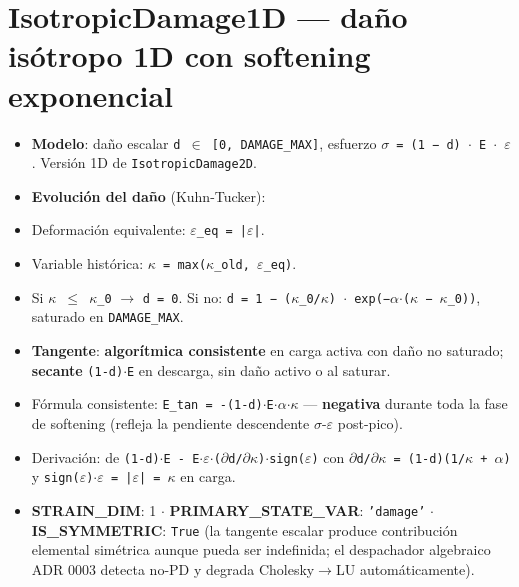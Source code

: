 \documentclass[11pt,letterpaper,oneside]{report}
\begin{document}
\section{IsotropicDamage1D --- daño isótropo 1D con softening exponencial}

\begin{itemize}
  \item \textbf{Modelo}: daño escalar \texttt{d \ensuremath{\in} [0, DAMAGE\_MAX]}, esfuerzo \texttt{\ensuremath{\sigma} = (1 − d) \ensuremath{\cdot} E \ensuremath{\cdot} \ensuremath{\varepsilon}}. Versión 1D de \texttt{IsotropicDamage2D}.
  \item \textbf{Evolución del daño} (Kuhn-Tucker):
  \item Deformación equivalente: \texttt{\ensuremath{\varepsilon}\_eq = |\ensuremath{\varepsilon}|}.
  \item Variable histórica: \texttt{\ensuremath{\kappa} = max(\ensuremath{\kappa}\_old, \ensuremath{\varepsilon}\_eq)}.
  \item Si \texttt{\ensuremath{\kappa} \ensuremath{\le} \ensuremath{\kappa}\_0} \ensuremath{\to} \texttt{d = 0}. Si no: \texttt{d = 1 − (\ensuremath{\kappa}\_0/\ensuremath{\kappa}) \ensuremath{\cdot} exp(−\ensuremath{\alpha}\ensuremath{\cdot}(\ensuremath{\kappa} − \ensuremath{\kappa}\_0))}, saturado en \texttt{DAMAGE\_MAX}.
  \item \textbf{Tangente}: \textbf{algorítmica consistente} en carga activa con daño no saturado; \textbf{secante} \texttt{(1-d)\ensuremath{\cdot}E} en descarga, sin daño activo o al saturar.
  \item Fórmula consistente: \texttt{E\_tan = -(1-d)\ensuremath{\cdot}E\ensuremath{\cdot}\ensuremath{\alpha}\ensuremath{\cdot}\ensuremath{\kappa}} --- \textbf{negativa} durante toda la fase de softening (refleja la pendiente descendente \ensuremath{\sigma}-\ensuremath{\varepsilon} post-pico).
  \item Derivación: de \texttt{(1-d)\ensuremath{\cdot}E - E\ensuremath{\cdot}\ensuremath{\varepsilon}\ensuremath{\cdot}(\ensuremath{\partial}d/\ensuremath{\partial}\ensuremath{\kappa})\ensuremath{\cdot}sign(\ensuremath{\varepsilon})} con \texttt{\ensuremath{\partial}d/\ensuremath{\partial}\ensuremath{\kappa} = (1-d)(1/\ensuremath{\kappa} + \ensuremath{\alpha})} y \texttt{sign(\ensuremath{\varepsilon})\ensuremath{\cdot}\ensuremath{\varepsilon} = |\ensuremath{\varepsilon}| = \ensuremath{\kappa}} en carga.
  \item \textbf{STRAIN\_DIM}: 1 \ensuremath{\cdot} \textbf{PRIMARY\_STATE\_VAR}: \texttt{'damage'} \ensuremath{\cdot} \textbf{IS\_SYMMETRIC}: \texttt{True} (la tangente escalar produce contribución elemental simétrica aunque pueda ser indefinida; el despachador algebraico ADR 0003 detecta no-PD y degrada Cholesky\ensuremath{\to}LU automáticamente).

\end{itemize}
\end{document}
